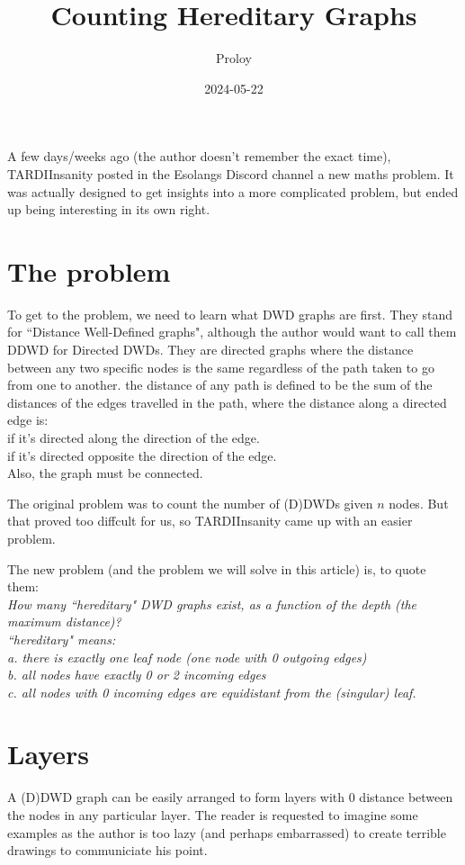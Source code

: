 \documentclass{article}
\title{Counting Hereditary Graphs}
\date{2024-05-22}
\author{Proloy}
\begin{document}
  \maketitle

  A few days/weeks ago (the author doesn't remember the exact time), TARDIInsanity posted in the Esolangs Discord channel a new maths problem. 
  It was actually designed to get insights into a more complicated problem, but ended up being interesting in its own right.

  \section{The problem}
  To get to the problem, we need to learn what DWD graphs are first. They stand for ``Distance Well-Defined graphs", 
  although the author would want to call them DDWD for Directed DWDs.
  They are directed graphs where the distance between any two specific nodes is the same regardless of the path taken to go from one to another.
  the distance of any path is defined to be the sum of the distances of the edges travelled in the path, where
  the distance along a directed edge is:\\
   if it's directed along the direction of the edge.\\
   if it's directed opposite the direction of the edge.\\

  Also, the graph must be connected.

  The original problem was to count the number of (D)DWDs given $n$ nodes. But that proved too diffcult for us, 
  so TARDIInsanity came up with an easier problem.
  
  \noindent The new problem (and the problem we will solve in this article) is, to quote them: \\
  \emph{
  \indent
     How many ``hereditary" DWD graphs exist, as a function of the depth (the maximum distance)?\\
  \indent ``hereditary" means: \\
  \indent \indent  a. there is exactly one leaf node (one node with 0 outgoing edges)\\
  \indent \indent  b. all nodes have exactly 0 or 2 incoming edges\\
  \indent \indent  c. all nodes with 0 incoming edges are equidistant from the (singular) leaf.
  }

  \section{Layers}
    A (D)DWD graph can be easily arranged to form layers with 0 distance between the nodes in any particular layer. The reader is requested to imagine some examples
    as the author is too lazy (and perhaps embarrassed) to create terrible drawings to communiciate his point.
\end{document}
